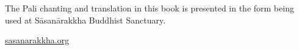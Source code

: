 \clearpage
\thispagestyle{empty}

\mbox{}
\vfill

{\centering

  
  The Pali chanting and translation in this book is presented in the form being
  used at Sāsanārakkha Buddhist Sanctuary.

  \href{https://sasanarakkha.org/}{sasanarakkha.org}

}

\vfill
\vspace*{5em}
\mbox{}
